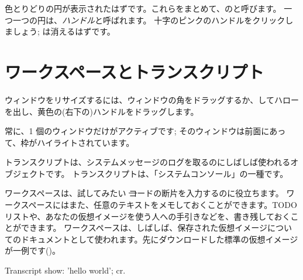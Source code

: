\documentclass[a4paper,10pt,twoside]{book}
\begin{document}
色とりどりの円が表示されたはずです。これらをまとめて、\bam のと呼びます。
一つ一つの円は、\emph{ハンドル}と呼ばれます。
十字のピンクのハンドルをクリックしましょう; \bam は消えるはずです。

\section{ワークスペースとトランスクリプト}


ウィンドウをリサイズするには、ウィンドウの角をドラッグするか、\metaclick してハローを出し、黄色の(右下の)ハンドルをドラッグします。

常に、1 個のウィンドウだけがアクティブです; そのウィンドウは前面にあって、枠がハイライトされています。

トランスクリプトは、システムメッセージのログを取るのにしばしば使われるオブジェクトです。
トランスクリプトは、「システムコンソール」の一種です。

ワークスペースは、試してみたい \st コードの断片を入力するのに役立ちます。
ワークスペースにはまた、任意のテキストをメモしておくことができます。TODO リストや、あなたの仮想イメージを使う人への手引きなどを、書き残しておくことができます。
ワークスペースは、しばしば、保存された仮想イメージについてのドキュメントとして使われます。先にダウンロードした標準の仮想イメージが一例です()。

\begin{code}{}
Transcript show: 'hello world'; cr.
\end{code}
\end{document}
